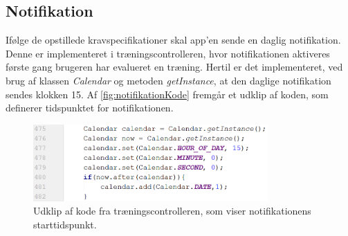 \subsection{Notifikation}
Ifølge de opstillede kravspecifikationer skal app'en sende en daglig notifikation. Denne er implementeret i træningscontrolleren, hvor notifikationen aktiveres første gang brugeren har evalueret en træning. Hertil er det implementeret, ved brug af klassen \textit{Calendar} og metoden \textit{getInstance}, at den daglige notifikation sendes klokken 15. Af \autoref{fig:notifikationKode} fremgår et udklip af koden, som definerer tidspunktet for notifikationen. 

\begin{figure} [H]
\centering
\includegraphics[width=0.8\textwidth]{figures/imple/notifikationKode}
\caption{Udklip af kode fra træningscontrolleren, som viser notifikationens starttidspunkt.}
\label{fig:notifikationKode}
\end{figure} 
